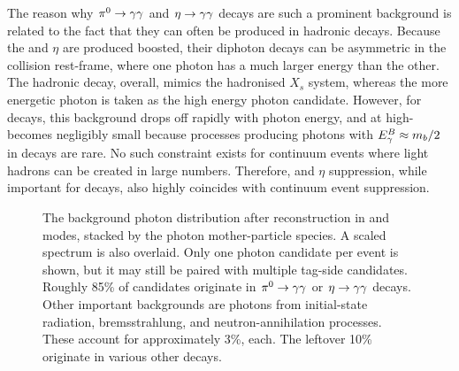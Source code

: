 The reason why $\pi^0\rightarrow\gamma\gamma$ and $\eta\rightarrow\gamma\gamma$ decays are such a prominent background is related to the fact that they can often be produced in hadronic decays.
Because the \piz and $\eta$ are produced boosted, their diphoton decays can be asymmetric in the \epem collision rest-frame, where one photon has a much larger energy than the other.
The hadronic decay, overall, mimics the hadronised $X_s$ system, whereas the more energetic photon is taken as the high energy photon candidate.
However, for \B decays, this background drops off rapidly with photon energy, and at high-\EB becomes negligibly small because processes producing photons with ${E^B_{\gamma}}\approx m_b/2$ in \B decays are rare.
No such constraint exists for continuum events where light hadrons can be created in large numbers.
Therefore, \piz and $\eta$ suppression, while important for \B decays, also highly coincides with continuum event suppression.

\begin{figure}[htbp!]
    \centering
    \caption{\label{fig:photon_sources} The background photon distribution after reconstruction in \feiBp and \feiBz modes, stacked by the photon mother-particle species.
    A scaled \BtoXsgamma spectrum is also overlaid.
    Only one photon candidate per event is shown, but it may still be paired with multiple tag-side candidates.
    Roughly 85\% of candidates originate in $\pi^0\rightarrow\gamma\gamma$ or $\eta\rightarrow\gamma\gamma$ decays.
    Other important backgrounds are photons from initial-state radiation, bremsstrahlung, and neutron-annihilation processes.
    These account for approximately 3\%, each.
    The leftover 10\% originate in various other decays.}
\end{figure}

